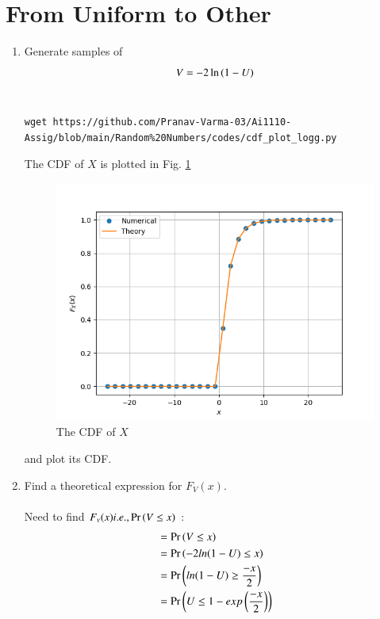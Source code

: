\documentclass[journal,12pt,twocolumn]{IEEEtran}
\renewcommand\thesection{\arabic{section}}
\begin{document}
\section{From Uniform to Other}
\begin{enumerate}[label=\thesection.\arabic*
,ref=\thesection.\theenumi]
%
\item
Generate samples of 
%
\begin{equation}
V = -2\ln\left(1-U\right)
\end{equation}
%
\solution\\
\begin{lstlisting}
wget https://github.com/Pranav-Varma-03/Ai1110-Assig/blob/main/Random%20Numbers/codes/cdf_plot_logg.py
\end{lstlisting}
The CDF of $X$ is plotted in Fig. \ref{fig:other_cdf}
\begin{figure}[ht]
\centering
\includegraphics[width=\columnwidth]{./figs/cdf_plot_other.png}
\caption{The CDF of $X$}
\label{fig:other_cdf}
\end{figure}
%
and plot its CDF.  
\item Find a theoretical expression for $F_V(x)$.\\
\solution\\
Need to find $F_v(x) i.e., \Pr\left(V \le x\right)$ :
\begin{align*}
    &= \Pr\left(V \le x\right)\\
    &= \Pr\left(-2ln(1-U) \le x\right)\\
    &= \Pr\left(ln(1-U) \ge \frac{-x}{2}\right) \\
    &= \Pr\left(U \le 1 - exp\left(\frac{-x}{2}\right)\right)
\end{align*}

\end{enumerate}
\end{document}
